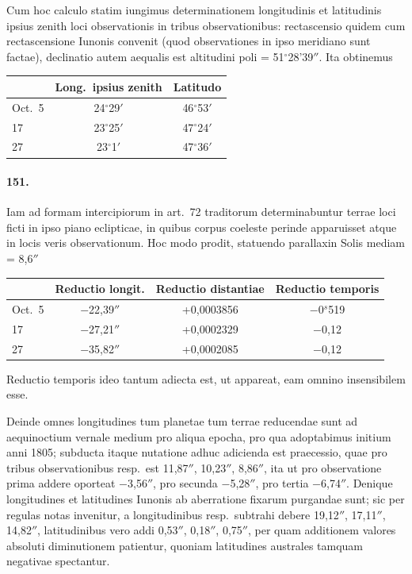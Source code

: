 \documentclass[12pt,a4paper]{article}
\begin{document}
Cum hoc calculo statim iungimus determinationem longitudinis et latitudinis ipsius zenith loci observationis in tribus observationibus: rectascensio quidem cum rectascensione Iunonis convenit (quod observationes in ipso meridiano sunt factae), declinatio autem aequalis est altitudini poli = 51$^\circ$28'39$''$. Ita obtinemus

\begin{center}
\begin{tabular}{lcc}
\toprule
& Long.~ipsius zenith & Latitudo\\
\midrule
Oct.\ 5 & 24$^\circ$29$'$ & 46$^\circ$53$'$\\
17 & 23$^\circ$25$'$ & 47$^\circ$24$'$\\
27 & 23$^\circ$1$'$ & 47$^\circ$36$'$\\
\bottomrule
\end{tabular}
\end{center}

\paragraph{151.}
Iam ad formam intercipiorum in art.~72 traditorum determinabuntur terrae loci ficti in ipso piano eclipticae, in quibus corpus coeleste perinde apparuisset atque in locis veris observationum. Hoc modo prodit, statuendo parallaxin Solis mediam = 8,6$''$

\begin{center}
\begin{tabular}{lccc}
\toprule
& Reductio longit. & Reductio distantiae & Reductio temporis\\
\midrule
Oct.\ 5 & $-$22,39$''$ & +0,0003856 & $-$0$^s$519\\
17 & $-$27,21$''$ & +0,0002329 & $-$0,12\\
27 & $-$35,82$''$ & +0,0002085 & $-$0,12\\
\bottomrule
\end{tabular}
\end{center}

Reductio temporis ideo tantum adiecta est, ut appareat, eam omnino insensibilem esse.

Deinde omnes longitudines tum planetae tum terrae reducendae sunt ad aequinoctium vernale medium pro aliqua epocha, pro qua adoptabimus initium anni 1805; subducta itaque nutatione adhuc adicienda est praecessio, quae pro tribus observationibus resp.~est 11,87$''$, 10,23$''$, 8,86$''$, ita ut pro observatione prima addere oporteat $-$3,56$''$, pro secunda $-$5,28$''$, pro tertia $-$6,74$''$. Denique longitudines et latitudines Iunonis ab aberratione fixarum purgandae sunt; sic per regulas notas invenitur, a longitudinibus resp.~subtrahi debere 19,12$''$, 17,11$''$, 14,82$''$, latitudinibus vero addi 0,53$''$, 0,18$''$, 0,75$''$, per quam additionem valores absoluti diminutionem patientur, quoniam latitudines australes tamquam negativae spectantur.
\end{document}
